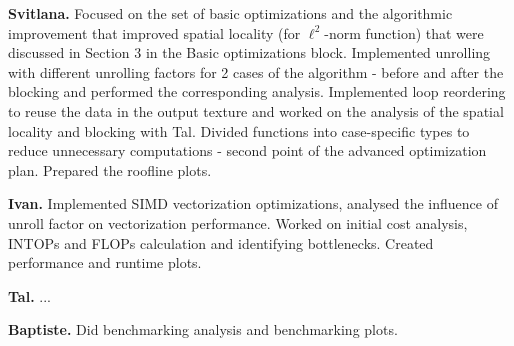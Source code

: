 \documentclass[letterpaper]{article}
\newcommand{\mypar}[1]{{\bf #1.}}
\begin{document}
\mypar{Svitlana} Focused on the set of basic optimizations and the algorithmic improvement that improved spatial locality (for $\ell ^2$-norm function) that were discussed in Section 3 in the Basic optimizations block. Implemented unrolling with different unrolling factors for 2 cases of the algorithm - before and after the blocking and performed the corresponding analysis. Implemented loop reordering to reuse the data in the output texture and worked on the analysis of the spatial locality and blocking with Tal. Divided functions into case-specific types to reduce unnecessary computations - second point of the advanced optimization plan. Prepared the roofline plots.

\mypar{Ivan} Implemented SIMD vectorization optimizations, analysed the influence of unroll factor on vectorization performance. Worked on initial cost analysis, INTOPs and FLOPs calculation and identifying bottlenecks. Created performance and runtime plots. 

\mypar{Tal} ...

\mypar{Baptiste} Did benchmarking analysis and benchmarking plots.





\end{document}
